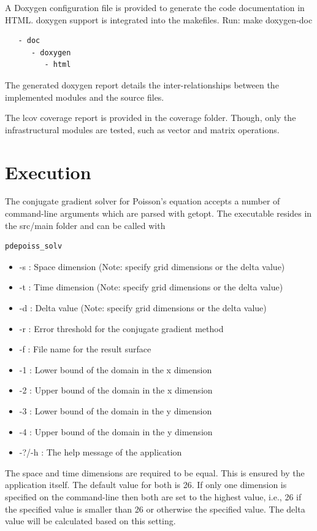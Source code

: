 \documentclass[12pt,a4paper]{report}
\begin{document}
A Doxygen configuration file is provided to generate the code
documentation in HTML. doxygen support is integrated into the
makefiles.  Run: make doxygen-doc

\begin{verbatim}
   - doc
      - doxygen
         - html
\end{verbatim}

The generated doxygen report details the inter-relationships between
the implemented modules and the source files.

The lcov coverage report is provided in the coverage folder. Though,
only the infrastructural modules are tested, such as vector and matrix
operations.

\section{Execution}
\label{sec:execution}

The conjugate gradient solver for Poisson's equation accepts a number
of command-line arguments which are parsed with getopt. The executable
resides in the src/main folder and can be
called with \begin{verbatim}pdepoiss_solv\end{verbatim}

\begin{itemize}
\item -s : Space dimension (Note: specify grid dimensions or the delta
  value)
\item -t : Time dimension (Note: specify grid dimensions or the delta
  value)
\item -d : Delta value (Note: specify grid dimensions or the delta
  value)
\item -r : Error threshold for the conjugate gradient method
\item -f : File name for the result surface
\item -1 : Lower bound of the domain in the x dimension
\item -2 : Upper bound of the domain in the x dimension
\item -3 : Lower bound of the domain in the y dimension
\item -4 : Upper bound of the domain in the y dimension
\item -?/-h : The help message of the application
\end{itemize}

The space and time dimensions are required to be equal. This is
ensured by the application itself. The default value for both is
26. If only one dimension is specified on the command-line then both
are set to the highest value, i.e., 26 if the specified value is
smaller than 26 or otherwise the specified value. The delta value will
be calculated based on this setting.
\end{document}
